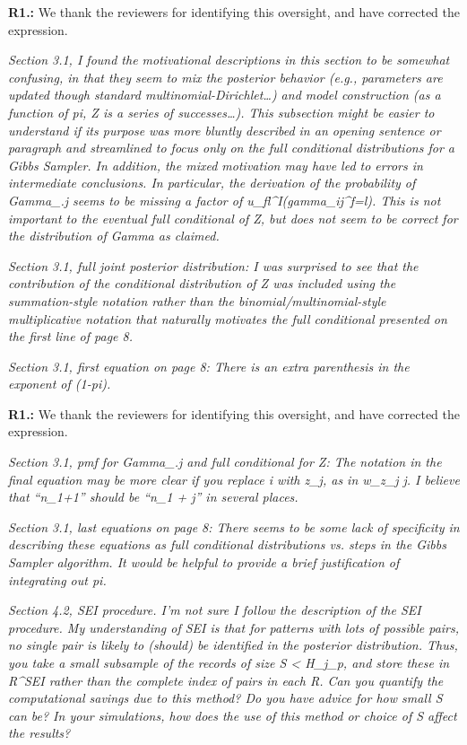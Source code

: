 \documentclass[letterpaper, parskip]{scrartcl}
\newcommand{\pointRaised}[1]{%
	\begin{tcolorbox}
		\itshape #1
	\end{tcolorbox}
}
\newcounter{responsectr}[section]     %
\newcommand{\reply}[2]{%
	\refstepcounter{responsectr}%
	\textbf{#1.\theresponsectr:} #2
}
\begin{document}
		\reply{R1}{%
	We thank the reviewers for identifying this oversight, and have corrected the expression. 
}
		\pointRaised{%
Section 3.1, I found the motivational descriptions in this section to be somewhat confusing, in
that they seem to mix the posterior behavior (e.g., parameters are updated though standard
multinomial-Dirichlet…) and model construction (as a function of pi, Z is a series of successes…).
This subsection might be easier to understand if its purpose was more bluntly described in an
opening sentence or paragraph and streamlined to focus only on the full conditional
distributions for a Gibbs Sampler. In addition, the mixed motivation may have led to errors in
intermediate conclusions. In particular, the derivation of the probability of Gamma_{.j} seems
to be missing a factor of u_{fl}^I(gamma_{ij}^f=l). This is not important to the eventual full
conditional of Z, but does not seem to be correct for the distribution of Gamma as claimed.
}
		\pointRaised{%
Section 3.1, full joint posterior distribution: I was surprised to see that the contribution of the
conditional distribution of Z was included using the summation-style notation rather than the
binomial/multinomial-style multiplicative notation that naturally motivates the full conditional
presented on the first line of page 8.
}
		\pointRaised{%
Section 3.1, first equation on page 8: There is an extra parenthesis in the exponent of (1-pi).
}
		\reply{R1}{%
	We thank the reviewers for identifying this oversight, and have corrected the expression. 
}
		\pointRaised{%
Section 3.1, pmf for Gamma_{.j} and full conditional for Z: The notation in the final equation
may be more clear if you replace i with z_j, as in w_{z_j j}. I believe that “n_1+1” should be “n_1
+ j” in several places.
}
		\pointRaised{%
Section 3.1, last equations on page 8: There seems to be some lack of specificity in describing
these equations as full conditional distributions vs. steps in the Gibbs Sampler algorithm. It
would be helpful to provide a brief justification of integrating out pi.
}
		\pointRaised{%
Section 4.2, SEI procedure. I’m not sure I follow the description of the SEI procedure. My
understanding of SEI is that for patterns with lots of possible pairs, no single pair is likely to
(should) be identified in the posterior distribution. Thus, you take a small subsample of the
records of size S < H_j_p, and store these in R^{SEI} rather than the complete index of pairs in
each R. Can you quantify the computational savings due to this method? Do you have advice for
how small S can be? In your simulations, how does the use of this method or choice of S affect
the results?
}
\end{document}
